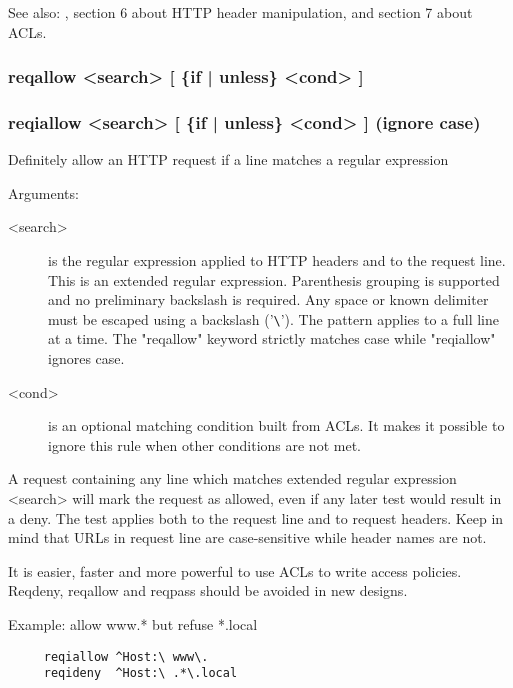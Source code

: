   See also: , section 6 about HTTP header manipulation, and section 7
            about ACLs.

\subsubsection[reqallow]{reqallow  <search> [ \{if | unless\} <cond> ]}
\subsubsection[reqiallow]{reqiallow <search> [ \{if | unless\} <cond> ] (ignore case)}


  Definitely allow an HTTP request if a line matches a regular expression


  Arguments:

\begin{description}
\item[<search>] is the regular expression applied to HTTP headers and to the
              request line. This is an extended regular expression. Parenthesis
              grouping is supported and no preliminary backslash is required.
              Any space or known delimiter must be escaped using a backslash
              ('\verb|\|'). The pattern applies to a full line at a time. The
              "reqallow" keyword strictly matches case while "reqiallow"
              ignores case.

\item[<cond>] is an optional matching condition built from ACLs. It makes it
              possible to ignore this rule when other conditions are not met.
\end{description}

  A request containing any line which matches extended regular expression
  <search> will mark the request as allowed, even if any later test would
  result in a deny. The test applies both to the request line and to request
  headers. Keep in mind that URLs in request line are case-sensitive while
  header names are not.

  It is easier, faster and more powerful to use ACLs to write access policies.
  Reqdeny, reqallow and reqpass should be avoided in new designs.

  Example: allow www.* but refuse *.local
\begin{verbatim}
     reqiallow ^Host:\ www\.
     reqideny  ^Host:\ .*\.local
\end{verbatim}

